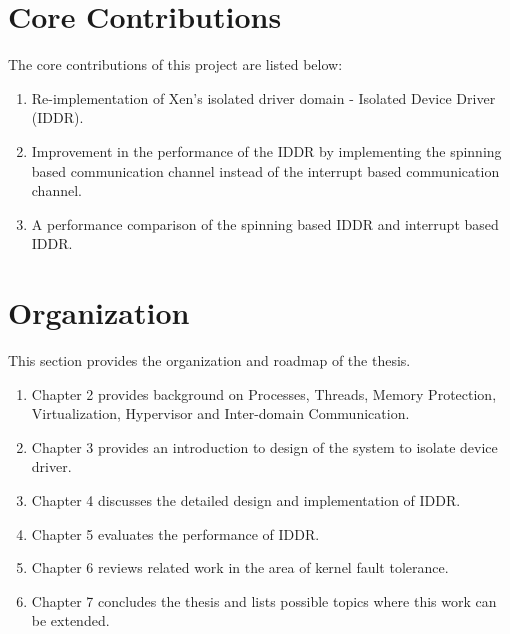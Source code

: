 \section{Core Contributions}
The core contributions of this project are listed below: 
\begin{enumerate}
\item Re-implementation of Xen's isolated driver domain - Isolated Device Driver (IDDR).
\item Improvement in the performance of the IDDR by implementing the spinning based communication channel instead of the interrupt based communication channel. 
\item A performance comparison of the spinning based IDDR and interrupt based IDDR.
\end{enumerate}
\section {Organization}
This section provides the organization and roadmap of the thesis.
\begin{enumerate}
\item Chapter 2 provides background on Processes, Threads, Memory Protection, Virtualization, Hypervisor and Inter-domain Communication.
\item Chapter 3 provides an introduction to design of the system to isolate device driver. 
\item Chapter 4 discusses the detailed design and implementation of IDDR. 
\item Chapter 5 evaluates the performance of IDDR.
\item Chapter 6 reviews related work in the area of kernel fault tolerance.
\item Chapter 7 concludes the thesis and lists possible topics where this work can be extended.
\end{enumerate}
\pagebreak
{}